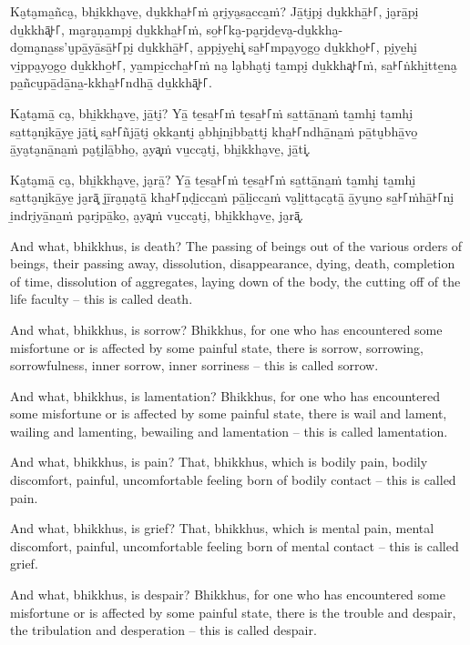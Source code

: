 Ka̮ta̮ma̱ñca̮, bhi̱kkha̮ve̱, du̱kkha̱꜔꜒ṁ a̮ri̮ya̮sa̱cca̱ṁ? Jā̱ti̮pi̮ du̱kkhā̱꜔꜒, ja̮rā̱pi̮ du̱kkhā͓꜔꜒,
ma̮ra̮ṇa̱mpi̮ du̱kkha̱꜔꜒ṁ, so̱꜔꜒ka̮-pa̮ri̮de̱va̮-du̱kkha̮-\\ do̱ma̮na̱ss'u̮pā̱yā̱sā̱꜔꜒pi̮ du̱kkhā̱꜔꜒, a̱ppi̮ye̱hi͓
sa̱꜔꜒mpa̮yo̱go̱ du̱kkho̱꜔꜒, pi̮ye̱hi̮ vi̱ppa̮yo̱go̱ du̱kkho̱꜔꜒, ya̱mpi̱ccha̱꜔꜒ṁ na̮ la̮bha̮ti̮ ta̱mpi̮ du̱kkha͓꜔꜒ṁ,
sa̱꜔꜒ṅkhi̱tte̱na̮ pa̱ñcu̮pā̱dā̱na̱-kkha̱꜔꜒ndhā̱ du̱kkhā͓꜔꜒.

Ka̮ta̮mā̱ ca̮, bhi̱kkha̮ve̱, jā̱ti̮? Yā̱ te̱sa̱꜔꜒ṁ te̱sa̱꜔꜒ṁ sa̱ttā̱na̱ṁ ta̱mhi̮ ta̱mhi̮ sa̱tta̮ni̮kā̱ye̱ jā̱ti͓
sa̱꜔꜒ñjā̱ti̮ o̱kka̱nti̮ a̮bhi̮ni̱bba̱tti̮ kha̱꜔꜒ndhā̱na̱ṁ pā̱tu̮bhā̱vo̱ ā̱ya̮ta̮nā̱na̱ṁ pa̮ṭi̮lā̱bho̱, a̮ya͓ṁ
vu̱cca̮ti̮, bhi̱kkha̮ve̱, jā̱ti͓.

Ka̮ta̮mā̱ ca̮, bhi̱kkha̮ve̱, ja̮rā̱? Yā̱ te̱sa̱꜔꜒ṁ te̱sa̱꜔꜒ṁ sa̱ttā̱na̱ṁ ta̱mhi̮ ta̱mhi̮ sa̱tta̮ni̮kā̱ye̱ ja̮rā͓
jī̱ra̮ṇa̮tā̱ kha̱꜔꜒ṇḍi̱cca̱ṁ pā̱li̱cca̱ṁ va̮li̱tta̮ca̮tā̱ ā̱yu̮no̱ sa̱꜔꜒ṁhā̱꜔꜒ni̮ i̱ndri̮yā̱na̱ṁ pa̮ri̮pā̱ko̱, a̮ya͓ṁ
vu̱cca̮ti̮, bhi̱kkha̮ve̱, ja̮rā͓.

\englishPage

And what, bhikkhus, is death? The passing of beings out of the various orders of
beings, their passing away, dissolution, disappearance, dying, death, completion
of time, dissolution of aggregates, laying down of the body, the cutting off of
the life faculty -- this is called death.

And what, bhikkhus, is sorrow? Bhikkhus, for one who has encountered some
misfortune or is affected by some painful state, there is sorrow, sorrowing,
sorrowfulness, inner sorrow, inner sorriness -- this is called sorrow.

And what, bhikkhus, is lamentation? Bhikkhus, for one who has encountered some
misfortune or is affected by some painful state, there is wail and lament,
wailing and lamenting, bewailing and lamentation -- this is called lamentation.

And what, bhikkhus, is pain? That, bhikkhus, which is bodily pain, bodily
discomfort, painful, uncomfortable feeling born of bodily contact -- this is
called pain.

And what, bhikkhus, is grief? That, bhikkhus, which is mental pain, mental
discomfort, painful, uncomfortable feeling born of mental contact -- this is
called grief.

And what, bhikkhus, is despair? Bhikkhus, for one who has encountered some
misfortune or is affected by some painful state, there is the trouble and
despair, the tribulation and desperation -- this is called despair.


